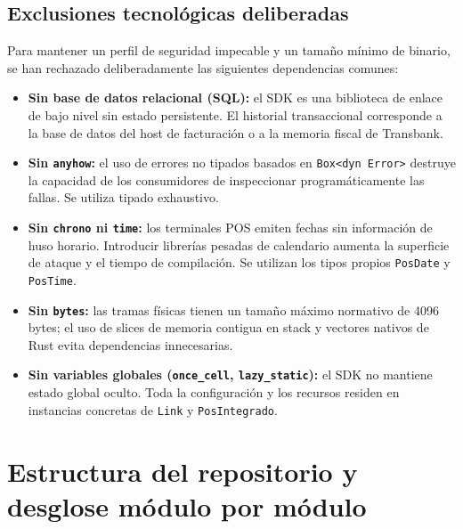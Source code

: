 \documentclass{../../plantilla/raysac-informe}
\begin{document}
\subsection{Exclusiones tecnológicas deliberadas}
Para mantener un perfil de seguridad impecable y un tamaño mínimo de binario, se han rechazado
deliberadamente las siguientes dependencias comunes:
\begin{itemize}
  \item \textbf{Sin base de datos relacional (SQL):} el SDK es una biblioteca de enlace de bajo nivel sin estado
    persistente. El historial transaccional corresponde a la base de datos del host de facturación o a la
    memoria fiscal de Transbank.
  \item \textbf{Sin \texttt{anyhow}:} el uso de errores no tipados basados en \texttt{Box<dyn Error>} destruye la
    capacidad de los consumidores de inspeccionar programáticamente las fallas. Se utiliza tipado exhaustivo.
  \item \textbf{Sin \texttt{chrono} ni \texttt{time}:} los terminales POS emiten fechas sin información de huso
    horario. Introducir librerías pesadas de calendario aumenta la superficie de ataque y el tiempo de compilación.
    Se utilizan los tipos propios \texttt{PosDate} y \texttt{PosTime}.
  \item \textbf{Sin \texttt{bytes}:} las tramas físicas tienen un tamaño máximo normativo de 4096 bytes; el uso
    de slices de memoria contigua en stack y vectores nativos de Rust evita dependencias innecesarias.
  \item \textbf{Sin variables globales (\texttt{once\_cell}, \texttt{lazy\_static}):} el SDK no mantiene estado
    global oculto. Toda la configuración y los recursos residen en instancias concretas de \texttt{Link} y
    \texttt{PosIntegrado}.
\end{itemize}

\clearpage
\section{Estructura del repositorio y desglose módulo por módulo}
\end{document}

